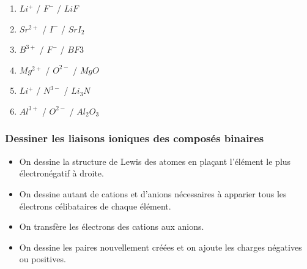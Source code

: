 \documentclass[
  11pt,
  a4paper,
  openany]{book}
\providecommand{\tightlist}{%
  \setlength{\itemsep}{0pt}\setlength{\parskip}{0pt}}
\begin{document}
\begin{Answer}

\begin{enumerate}
\def\labelenumi{\alph{enumi}.}
\item
  \(Li^+\) / \(F^-\) / \(LiF\)
\item
  \(Sr^{2+}\) / \(I^{-}\) / \(SrI_2\)
\item
  \(B^{3+}\) / \(F^-\) / \(BF3\)
\item
  \(Mg^{2+}\) / \(O^{2-}\) / \(MgO\)
\item
  \(Li^+\) / \(N^{3-}\) / \(Li_3N\)
\item
  \(Al^{3+}\) / \(O^{2-}\) / \(Al_2O_3\)
\end{enumerate}

\end{Answer}

\newpage

\subsubsection{Dessiner les liaisons ioniques des composés binaires}\label{dessiner-les-liaisons-ioniques-des-composuxe9s-binaires}

\begin{itemize}
\tightlist
\item
  On dessine la structure de Lewis des atomes en plaçant l'élément le plus électronégatif à droite.
\item
  On dessine autant de cations et d'anions nécessaires à apparier tous les électrons célibataires de chaque élément.
\item
  On transfère les électrons des cations aux anions.
\item
  On dessine les paires nouvellement créées et on ajoute les charges négatives ou positives.
\end{itemize}
\end{document}

